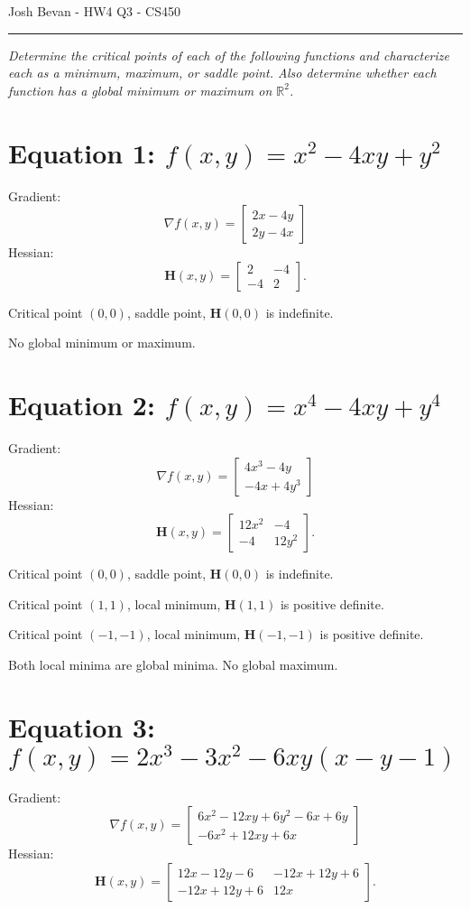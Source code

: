 \documentclass[letterpaper,10pt]{article}
\begin{document}
\begin{flushright}
{\Large Josh Bevan - HW4 Q3 - CS450}
\end{flushright}
\vskip -0.1in
\hrule
\vskip 0.3in

\textit{Determine the critical points of each of the following functions and characterize each as a minimum, maximum, or saddle point. Also determine whether each function has a global minimum or maximum on $\mathbb{R}^2$.}

\section*{Equation 1: $f(x, y) = x^2 - 4xy + y^2$}
Gradient:
$$\nabla f(x,y) = \begin{bmatrix} 2x - 4y \\ 2y - 4x \end{bmatrix}$$
Hessian:
$$\mathbf{H}(x,y) = \begin{bmatrix} 2 & -4 \\ -4 & 2 \end{bmatrix}.$$

Critical point $(0, 0)$, saddle point, $\mathbf{H}(0,0)$ is
indefinite.

No global minimum or maximum.

\section*{Equation 2: $f(x, y) = x^4 - 4xy + y^4$}
Gradient:
$$\nabla f(x,y) = \begin{bmatrix} 4x^3 - 4y \\ -4x + 4y^3 \end{bmatrix}$$
Hessian:
$$\mathbf{H}(x,y) = \begin{bmatrix} 12x^2 & -4 \\ -4 & 12y^2 \end{bmatrix}.$$

Critical point $(0,0)$, saddle point, $\mathbf{H}(0,0)$ is
indefinite.

Critical point $(1,1)$, local minimum, $\mathbf{H}(1,1)$ is positive definite.

Critical point $(-1,-1)$, local minimum, $\mathbf{H}(-1,-1)$ is positive definite.

Both local minima are global minima. No global maximum.

\section*{Equation 3: $f(x, y) = 2x^3 - 3x^2 - 6xy(x - y - 1)$}
Gradient:
$$\nabla f(x,y) = \begin{bmatrix}
    6x^2 - 12xy + 6y^2 - 6x + 6y \\
    -6x^2 + 12xy + 6x \end{bmatrix}$$
Hessian:    
$$\mathbf{H}(x,y) = \begin{bmatrix}
    12x - 12y - 6 & -12x + 12y + 6 \\
    -12x + 12y + 6 & 12x \end{bmatrix}.$$
    
\end{document}
